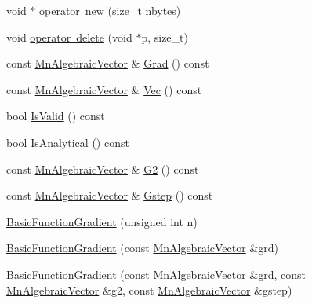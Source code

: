 \begin{DoxyCompactItemize}
\item 
void $\ast$ \mbox{\hyperlink{classROOT_1_1Minuit2_1_1BasicFunctionGradient_a2b08ebb0074a43cfca91f74991c660d5}{operator new}} (size\+\_\+t nbytes)
\item 
void \mbox{\hyperlink{classROOT_1_1Minuit2_1_1BasicFunctionGradient_acc4585a778dae54497b4c4342a4dcd1e}{operator delete}} (void $\ast$p, size\+\_\+t)
\item 
const \mbox{\hyperlink{namespaceROOT_1_1Minuit2_a62ed97730a1ca8d3fbaec64a19aa11c9}{Mn\+Algebraic\+Vector}} \& \mbox{\hyperlink{classROOT_1_1Minuit2_1_1BasicFunctionGradient_a724c9b5e8c9cf8646eb362017158f52d}{Grad}} () const
\item 
const \mbox{\hyperlink{namespaceROOT_1_1Minuit2_a62ed97730a1ca8d3fbaec64a19aa11c9}{Mn\+Algebraic\+Vector}} \& \mbox{\hyperlink{classROOT_1_1Minuit2_1_1BasicFunctionGradient_a4c0d60175db412ac03313f824a055886}{Vec}} () const
\item 
bool \mbox{\hyperlink{classROOT_1_1Minuit2_1_1BasicFunctionGradient_a53963689701d2b3477e176920efdd3f9}{Is\+Valid}} () const
\item 
bool \mbox{\hyperlink{classROOT_1_1Minuit2_1_1BasicFunctionGradient_a6e4d212f4a441b9b58c6886b2c4c50ce}{Is\+Analytical}} () const
\item 
const \mbox{\hyperlink{namespaceROOT_1_1Minuit2_a62ed97730a1ca8d3fbaec64a19aa11c9}{Mn\+Algebraic\+Vector}} \& \mbox{\hyperlink{classROOT_1_1Minuit2_1_1BasicFunctionGradient_a7d06765b80da1a8baa4af474b503ec6c}{G2}} () const
\item 
const \mbox{\hyperlink{namespaceROOT_1_1Minuit2_a62ed97730a1ca8d3fbaec64a19aa11c9}{Mn\+Algebraic\+Vector}} \& \mbox{\hyperlink{classROOT_1_1Minuit2_1_1BasicFunctionGradient_a32966146618c6e1435f76dd851e7c014}{Gstep}} () const
\item 
\mbox{\hyperlink{classROOT_1_1Minuit2_1_1BasicFunctionGradient_ae23497e9b9a0f07542b5f6a017db6259}{Basic\+Function\+Gradient}} (unsigned int n)
\item 
\mbox{\hyperlink{classROOT_1_1Minuit2_1_1BasicFunctionGradient_aace69521fac422830a6a6e19b1f6fd77}{Basic\+Function\+Gradient}} (const \mbox{\hyperlink{namespaceROOT_1_1Minuit2_a62ed97730a1ca8d3fbaec64a19aa11c9}{Mn\+Algebraic\+Vector}} \&grd)
\item 
\mbox{\hyperlink{classROOT_1_1Minuit2_1_1BasicFunctionGradient_a21eb32598f6a67f9cb45c1f4dac05825}{Basic\+Function\+Gradient}} (const \mbox{\hyperlink{namespaceROOT_1_1Minuit2_a62ed97730a1ca8d3fbaec64a19aa11c9}{Mn\+Algebraic\+Vector}} \&grd, const \mbox{\hyperlink{namespaceROOT_1_1Minuit2_a62ed97730a1ca8d3fbaec64a19aa11c9}{Mn\+Algebraic\+Vector}} \&g2, const \mbox{\hyperlink{namespaceROOT_1_1Minuit2_a62ed97730a1ca8d3fbaec64a19aa11c9}{Mn\+Algebraic\+Vector}} \&gstep)

\end{DoxyCompactItemize}
